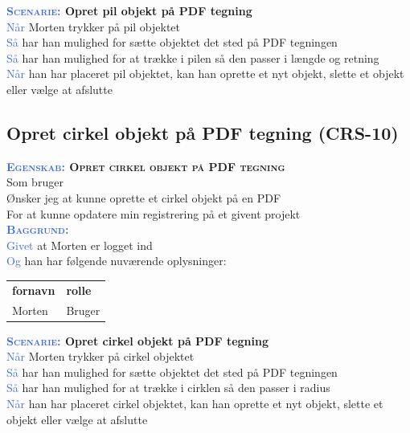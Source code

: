 \textbf{\textsc{\textcolor{RoyalBlue}{Scenarie:}} Opret pil objekt på PDF tegning}\\
\textcolor{RoyalBlue}{Når} Morten trykker på pil objektet\\
\textcolor{RoyalBlue}{Så}  har han mulighed for sætte objektet det sted på PDF tegningen\\
\textcolor{RoyalBlue}{Så}  har han mulighed for at trække i pilen så den passer i længde og retning\\
\textcolor{RoyalBlue}{Når} han har placeret pil objektet, kan han oprette et nyt objekt, slette et objekt eller vælge at afslutte \\

\subsection{Opret cirkel objekt på PDF tegning (CRS-10)} \label{sec:USOpretCirkelObjekt}
\textbf{\textsc{\textcolor{RoyalBlue}{Egenskab:} Opret cirkel objekt på PDF tegning}}\\
Som bruger\\
Ønsker jeg at kunne oprette et cirkel objekt på en PDF\\
For at kunne opdatere min registrering på et givent projekt \\

\textsc{\textcolor{RoyalBlue}{\textbf{Baggrund:}}}\\
\textcolor{RoyalBlue}{Givet} at Morten er logget ind\\
\textcolor{RoyalBlue}{Og} han har følgende nuværende oplysninger:\\
\begin{tabular}{| l | l |}
	\textbf{fornavn} & \textbf{rolle} \\
	Morten & Bruger\\
\end{tabular}

\textbf{\textsc{\textcolor{RoyalBlue}{Scenarie:}} Opret cirkel objekt på PDF tegning}\\
\textcolor{RoyalBlue}{Når} Morten trykker på cirkel objektet\\
\textcolor{RoyalBlue}{Så}  har han mulighed for sætte objektet det sted på PDF tegningen\\
\textcolor{RoyalBlue}{Så}  har han mulighed for at trække i cirklen så den passer i radius\\
\textcolor{RoyalBlue}{Når} han har placeret cirkel objektet, kan han oprette et nyt objekt, slette et objekt eller vælge at afslutte \\

